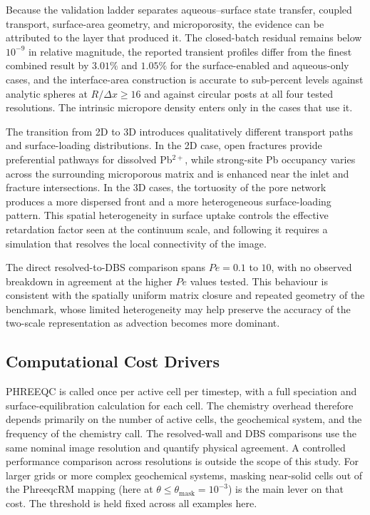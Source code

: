 Because the validation ladder separates aqueous--surface state transfer,
coupled transport, surface-area geometry, and microporosity, the evidence can
be attributed to the layer that produced it. The closed-batch residual remains
below $10^{-9}$ in relative magnitude, the reported transient profiles differ
from the finest combined result by $3.01\%$ and $1.05\%$ for the
surface-enabled and aqueous-only cases, and the interface-area construction is
accurate to sub-percent levels against analytic spheres at
$R/\Delta x\ge16$ and against circular posts at all four tested resolutions. The
intrinsic micropore density enters only in the cases that use it.

The transition from 2D to 3D introduces qualitatively different transport paths
and surface-loading distributions. In the 2D case, open fractures provide
preferential pathways for dissolved Pb$^{2+}$, while strong-site Pb occupancy
varies across the surrounding microporous matrix and is enhanced near the inlet
and fracture intersections. In the 3D cases, the tortuosity of the
pore network produces a more dispersed front and a more heterogeneous
surface-loading pattern. This spatial heterogeneity in surface uptake controls the effective retardation
factor seen at the continuum scale, and following it requires a simulation that
resolves the local connectivity of the image.

The direct resolved-to-DBS comparison spans $Pe=0.1$ to $10$, with no
observed breakdown in agreement at the higher $Pe$ values tested. This
behaviour is consistent with the spatially uniform matrix closure and
repeated geometry of the benchmark, whose limited heterogeneity may help
preserve the accuracy of the two-scale representation as advection becomes
more dominant.

\subsection{Computational Cost Drivers}

PHREEQC is called once per active cell per timestep, with a full speciation
and surface-equilibration calculation for each cell. The chemistry overhead
therefore depends primarily on the number of active cells, the geochemical
system, and the frequency of the chemistry call. The resolved-wall and DBS
comparisons use the same nominal image resolution and quantify physical
agreement. A controlled performance comparison across resolutions is outside
the scope of this study. For larger grids or more complex geochemical systems,
masking near-solid cells
out of the PhreeqcRM mapping (here at
$\theta \le \theta_{\mathrm{mask}} = 10^{-3}$) is the main lever on that cost.
The threshold is held fixed across all examples here.

